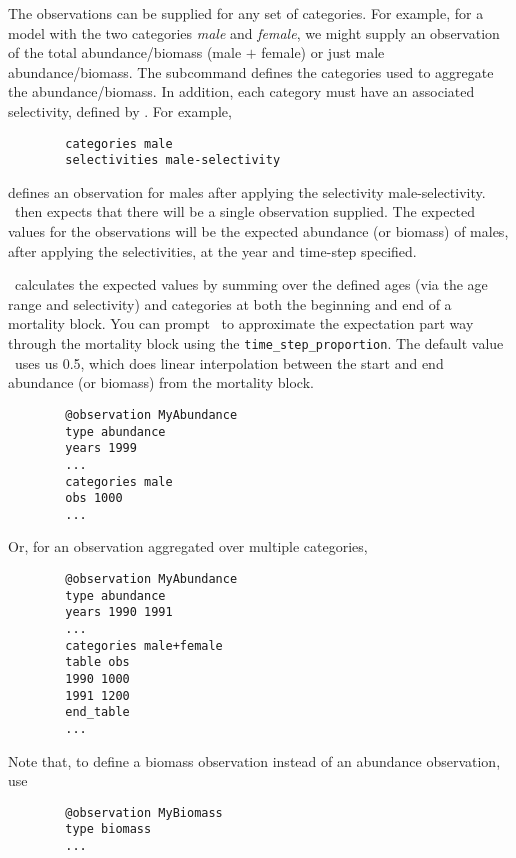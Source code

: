 The observations can be supplied for any set of categories. For example, for a model with the two categories \emph{male} and \emph{female}, we might supply an observation of the total abundance/biomass (male $+$ female) or just male abundance/biomass. The subcommand  defines the categories used to aggregate the abundance/biomass. In addition, each category must have an associated selectivity, defined by . For example,  

{\small{\begin{verbatim}
		categories male
		selectivities male-selectivity
		\end{verbatim}}}

defines an observation for males after applying the selectivity male-selectivity. \CNAME\ then expects that there will be a single observation supplied. The expected values for the observations will be the expected abundance (or biomass) of males, after applying the selectivities, at the year and time-step specified. 

\CNAME\ calculates the expected values by summing over the defined ages (via the age range and selectivity) and categories at both the beginning and end of a mortality block. You can prompt \CNAME\ to approximate the expectation part way through the mortality block using the \texttt{time\_step\_proportion}. The default value \CNAME\ uses us 0.5, which does linear interpolation between the start and end abundance (or biomass) from the mortality block.


{\small{\begin{verbatim}
		@observation MyAbundance
		type abundance
		years 1999
		...
		categories male 
		obs 1000
		...
		\end{verbatim}}}

Or, for an observation aggregated over multiple categories,

{\small{\begin{verbatim}
		@observation MyAbundance
		type abundance
		years 1990 1991
		...
		categories male+female
		table obs
		1990 1000
		1991 1200
		end_table
		...
		\end{verbatim}}}


Note that, to define a biomass observation instead of an abundance observation, use 

{\small{\begin{verbatim}
		@observation MyBiomass
		type biomass
		...
		\end{verbatim}}}

